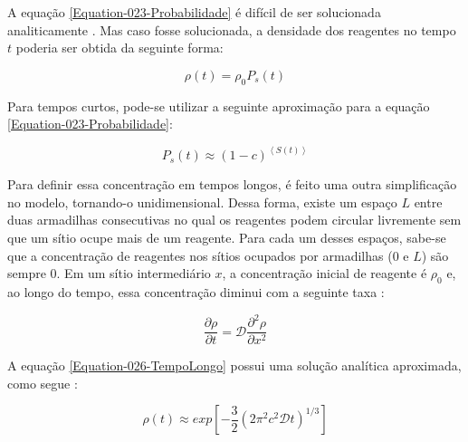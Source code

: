 A equação \ref{Equation-023-Probabilidade} é difícil de ser solucionada
analiticamente \cite{3}. Mas caso fosse solucionada, a densidade dos reagentes no
tempo $t$ poderia ser obtida da seguinte forma:

{
\setlength{\belowdisplayskip}{0pt} \setlength{\belowdisplayshortskip}{0pt}
\setlength{\abovedisplayskip}{0pt} \setlength{\abovedisplayshortskip}{0pt}

\begin{equation}
  \rho(t) = \rho_0P_s(t)
  \label{Equation-024}
\end{equation}
}

Para tempos curtos, pode-se utilizar a seguinte aproximação para a equação
\ref{Equation-023-Probabilidade}:

{
\setlength{\belowdisplayskip}{0pt} \setlength{\belowdisplayshortskip}{0pt}
\setlength{\abovedisplayskip}{0pt} \setlength{\abovedisplayshortskip}{0pt}

\begin{equation}
  P_s(t) \approx (1-c)^{\left<S(t)\right>}
  \label{Equation-025}
\end{equation}
}

Para definir essa concentração em tempos longos, é feito uma outra simplificação
no modelo, tornando-o unidimensional. Dessa forma, existe um espaço $L$ entre duas
armadilhas consecutivas no qual os reagentes podem circular livremente sem que
um sítio ocupe mais de um reagente. Para cada um desses espaços, sabe-se que a
concentração de reagentes nos sítios ocupados por armadilhas (0 e $L$) são sempre
0. Em um sítio intermediário $x$, a concentração inicial de reagente é $\rho_0$ e,
ao longo do tempo, essa concentração diminui com a seguinte taxa \cite{3}:

{
\setlength{\belowdisplayskip}{0pt} \setlength{\belowdisplayshortskip}{0pt}
\setlength{\abovedisplayskip}{0pt} \setlength{\abovedisplayshortskip}{0pt}

\begin{equation}
  \dfrac{\partial \rho}{\partial t} = \mathcal{D}\dfrac{\partial^2 \rho}{\partial x^2}
  \label{Equation-026-TempoLongo}
\end{equation}
}

A equação \ref{Equation-026-TempoLongo} possui uma solução analítica aproximada,
como segue \cite{3}:

{
\setlength{\belowdisplayskip}{0pt} \setlength{\belowdisplayshortskip}{0pt}
\setlength{\abovedisplayskip}{0pt} \setlength{\abovedisplayshortskip}{0pt}

\begin{equation}
  \rho(t) \approx exp\left[ -\dfrac{3}{2} (2\pi^2c^2\mathcal{D}t)^{1/3} \right]
  \label{Equation-027-Decaimento}
\end{equation}
}
